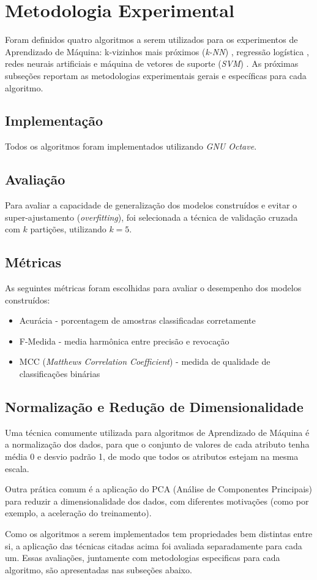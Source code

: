 \section{Metodologia Experimental}

Foram definidos quatro algoritmos a serem utilizados para os experimentos de Aprendizado de Máquina: k-vizinhos mais próximos (\emph{k-NN}) \cite{knn}, regressão logística \cite{logistic}, redes neurais artificiais \cite{neural_networks} e máquina de vetores de suporte (\emph{SVM}) \cite{svm}. As próximas subseções reportam as metodologias experimentais gerais e específicas para cada algoritmo.

\subsection{Implementação}
Todos os algoritmos foram implementados utilizando \emph{GNU Octave}.

\subsection{Avaliação}
Para avaliar a capacidade de generalização dos modelos construídos e evitar o super-ajustamento (\emph{overfitting}), foi selecionada a técnica de validação cruzada com $k$ partições, utilizando $k = 5$. 

\subsection{Métricas}
As seguintes métricas foram escolhidas para avaliar o desempenho dos modelos construídos:

\begin{itemize}
\item Acurácia - porcentagem de amostras classificadas corretamente
\item F-Medida - media harmônica entre precisão e revocação
\item MCC (\emph{Matthews Correlation Coefficient}) - medida de qualidade de classificações binárias
\end{itemize}

\subsection{Normalização e Redução de Dimensionalidade}
Uma técnica comumente utilizada para algoritmos de Aprendizado de Máquina é a normalização dos dados, para que o conjunto de valores de cada atributo tenha média 0 e desvio padrão 1, de modo que todos os atributos estejam na mesma escala. 

Outra prática comum é a aplicação do PCA (Análise de Componentes Principais) para reduzir a dimensionalidade dos dados, com diferentes motivações (como por exemplo, a aceleração do treinamento). 

Como os algoritmos a serem implementados tem propriedades bem distintas entre si, a aplicação das técnicas citadas acima foi avaliada separadamente para cada um. Essas avaliações, juntamente com metodologias especificas para cada algoritmo, são apresentadas nas subseções abaixo.




